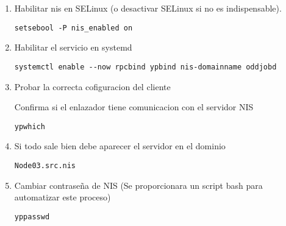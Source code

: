 \documentclass[../main.tex]{subfiles}
\begin{document}
\begin{enumerate}
\item Habilitar nis en SELinux (o desactivar SELinux si no es indispensable).
  
\begin{lstlisting}
setsebool -P nis_enabled on 
\end{lstlisting}

\item Habilitar el servicio en systemd

  \begin{lstlisting}
systemctl enable --now rpcbind ypbind nis-domainname oddjobd
\end{lstlisting}

\item Probar la correcta cofiguracion del cliente

  Confirma si el enlazador tiene comunicacion con el servidor NIS

  \begin{lstlisting}
ypwhich
\end{lstlisting}
\item Si todo sale bien debe aparecer el servidor en el dominio
  \begin{lstlisting}
Node03.src.nis
\end{lstlisting}
\item Cambiar contraseña de NIS (Se proporcionara un
  script bash para automatizar este proceso)

  \begin{lstlisting}
yppasswd
\end{lstlisting}
  
\end{enumerate}
\end{document}

